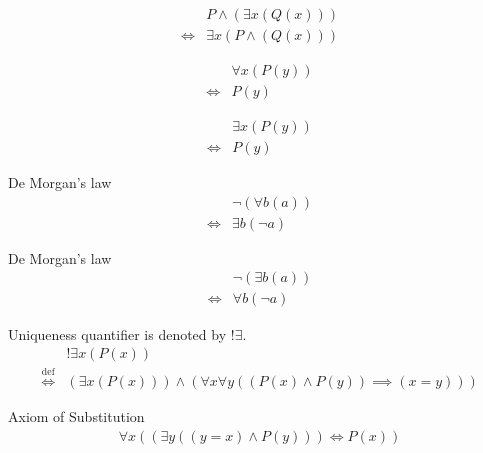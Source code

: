 \begin{prop}
\label{Proposition:land_exists_distributivity}
\begin{align*}
& P \land (\exists x (Q(x))) \\
\iff & \exists x (P \land (Q(x)))
\end{align*}
\end{prop}

\begin{axm}
\label{Axiom:forall_independent_variable}
\begin{align*}
& \forall x (P(y)) \\
\iff & P(y)
\end{align*}
\end{axm}

\begin{axm}
\label{Axiom:exists_independent_variable}
\begin{align*}
& \exists x (P(y)) \\
\iff & P(y)
\end{align*}
\end{axm}

\begin{prop}
\label{Proposition:De_Morgan_1}
De Morgan's law
\begin{align*}
& \lnot (\forall b (a)) \\
\iff & \exists b (\lnot a)
\end{align*}
\end{prop}

\begin{prop}
\label{Proposition:De_Morgan_2}
De Morgan's law
\begin{align*}
& \lnot (\exists b (a)) \\
\iff & \forall b (\lnot a)
\end{align*}
\end{prop}

\begin{defn}
\label{Definition:uniqueness_quantifier}
Uniqueness quantifier is denoted by $!\exists$.
\begin{align*}
& !\exists x (P(x)) \\
\overset{\operatorname{def}}{\iff} & (\exists x (P(x))) \land (\forall x \forall y ((P(x) \land P(y)) \implies (x = y)))
\end{align*}
\end{defn}

\begin{axm}
\label{Axiom:axiom_of_substitution}
Axiom of Substitution
\begin{align*}
\forall x ((\exists y ((y = x) \land P(y))) \iff P(x))
\end{align*}
\end{axm}

